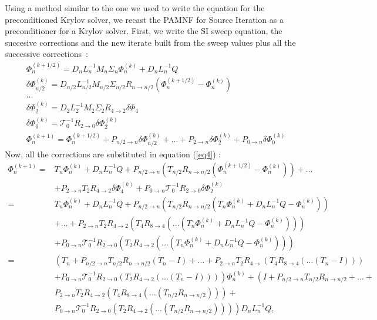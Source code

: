 \documentclass[preprint,10pt]{elsarticle}
\renewcommand{\(}{\left(}
\renewcommand{\)}{\right)}
\renewcommand{\[}{\left[}
\renewcommand{\]}{\right]}
\begin{document}
Using a method similar to the one we used to write the equation for the 
preconditioned Krylov solver, we recast the PAMNF for Source Iteration as a
preconditioner for a Krylov solver. First, we write the SI sweep equation, the
succesive corrections and the new iterate built from the sweep values plus all
the successive \hbox{corrections :}
\begin{align}
& \Phi_n^{(k+1/2)} = D_n L_n^{-1} M_n \Sigma_n \Phi_n^{(k)} + D_n L_n^{-1} Q
\label{eq1}\\
& \delta \Phi_{n/2}^{(k)} = D_{n/2} L_{n/2}^{-1} M_{n/2} \Sigma_{n/2}
R_{n\rightarrow n/2} \(\Phi_n^{(k+1/2)}-\Phi_n^{(k)}\) \label{eq2}\\
& \hdots\\
& \delta \Phi_2^{(k)} = D_2 L_2^{-1} M_2 \Sigma_2 R_{4\rightarrow 2} \delta \Phi_4\\
& \delta \Phi_0^{(k)} = \mathcal{T}_0^{-1} R_{2\rightarrow 0} \delta
\Phi_2^{(k)} \label{eq3}\\
& \Phi_n^{(k+1)} = \Phi_n^{(k+1/2)} + P_{n/2 \rightarrow n} \delta
\Phi_{n/2}^{(k)} + \hdots + P_{2 \rightarrow n} \delta \Phi_{2}^{(k)} + P_{0
\rightarrow n} \delta \Phi_{0}^{(k)}\label{eq4}
\end{align}
Now, all the corrections are substituted in equation (\ref{eq4}) :
\begin{equation}
\begin{split}
\Phi_n^{(k+1)} =& T_n \Phi_n^{(k)} + D_n L_n^{-1} Q +
P_{n/2 \rightarrow n} \(T_{n/2}
R_{n\rightarrow n/2} \(\Phi_n^{(k+1/2)} - \Phi_n^{(k)}\)\)+\hdots \\
&+ P_{2 \rightarrow n} T_2 R_{4\rightarrow 2} \delta
\Phi_{4}^{(k)} + P_{0\rightarrow n} \mathcal{T}_0^{-1} R_{2\rightarrow 0} \delta 
\Phi_2^{(k)}\\
=& T_n \Phi_n^{(k)} + D_n L_n^{-1} Q + P_{n/2 \rightarrow
n} \(T_{n/2} R_{n \rightarrow n/2}\(T_n \Phi_n^{(k)} +D_n L_n^{-1} Q -\Phi_n^{(k)}
\)\)\\
& +\hdots + P_{2\rightarrow n} T_2 R_{4\rightarrow 2} 
\(T_4 R_{8\rightarrow 4}\( \hdots \(T_n \Phi_n^{(k)} + D_n L_n^{-1} Q -
 \Phi_n^{(k)}\)\) \) \\ 
&+ P_{0\rightarrow n} \mathcal{T}_0^{-1} R_{2\rightarrow 0}\(T_2 R_{4\rightarrow 2} 
\(\hdots\(T_n \Phi_n^{(k)}+D_n L_n^{-1}Q-\Phi_n^{(k)}\)\)\)\\
=& \(T_n + P_{n/2\rightarrow n} T_{n/2} R_{n\rightarrow n/2}\(T_n-I\)+
 \hdots + P_{2\rightarrow n} T_2 R_{4\rightarrow}
\(T_4 R_{8\rightarrow 4} \(\hdots\(T_n -I\)\)\)\right.\\ 
&\left. +P_{0\rightarrow n} \mathcal{T}_0^{-1} R_{2\rightarrow 0}  \(T_2
R_{4\rightarrow 2} (\hdots \(T_n-I\))\)\) \Phi_n^{(k)}
+\(I+P_{n/2\rightarrow n} T_{n/2} R_{n\rightarrow
n/2}+ \hdots + \right.\\
&\left. P_{2\rightarrow n} T_2 R_{4\rightarrow 2} \(T_4
 R_{8\rightarrow 4}\(\hdots
\(T_{n/2}R_{n\rightarrow n/2}\)\)\)+\right.\\
& \left. P_{0\rightarrow n} \mathcal{T}_0^{-1}R_{2\rightarrow 0}
\(T_2 R_{4\rightarrow 2}\(\hdots\(T_{n/2}R_{n\rightarrow n/2}\)\)\)\)
D_nL_n^{-1} Q ,
\end{split}
\end{equation}
\end{document}
